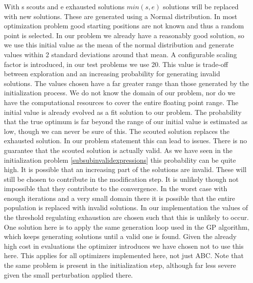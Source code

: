 With s scouts and e exhausted solutions $min(s, e)$ solutions will be replaced with new solutions. These are generated using a Normal distribution. In most optimization problem good starting positions are not known and thus a random point is selected. In our problem we already have a reasonably good solution, so we use this initial value as the mean of the normal distribution and generate values within 2 standard deviations around that mean. A configurable scaling factor is introduced, in our test problems we use 20. This value is trade-off between exploration and an increasing probability for generating invalid solutions. The values chosen have a far greater range than those generated by the initialization process. We do not know the domain of our problem, nor do we have the computational resources to cover the entire floating point range. The initial value is already evolved as a fit solution to our problem. The probability that the true optimum is far beyond the range of our initial value is estimated as low, though we can never be sure of this. The scouted solution replaces the exhausted solution. In our problem statement this can lead to issues. There is no guarantee that the scouted solution is actually valid. As we have seen in the initialization problem \ref{subsubinvalidexpressions} this probability can be quite high. It is possible that an increasing part of the solutions are invalid. These will still be chosen to contribute in the modification step. It is unlikely though not impossible that they contribute to the convergence. In the worst case with enough iterations and a very small domain there it is possible that the entire population is replaced with invalid solutions. In our implementation the values of the threshold regulating exhaustion are chosen such that this is unlikely to occur. One solution here is to apply the same generation loop used in the GP algorithm, which keeps generating solutions until a valid one is found. Given the already high cost in evaluations the optimizer introduces we have chosen not to use this here. This applies for all optimizers implemented here, not just ABC. Note that the same problem is present in the initialization step, although far less severe given the small perturbation applied there.

